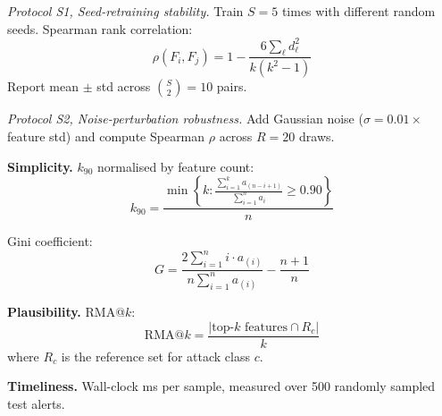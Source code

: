 \documentclass[12pt,a4paper]{report}
\begin{document}
\noindent\textit{Protocol S1, Seed-retraining stability.} Train $S = 5$ times with different random seeds. Spearman rank correlation:
\begin{equation}
\rho(F_i, F_j) = 1 - \frac{6 \sum_\ell d_\ell^2}{k(k^2 - 1)}
\end{equation}
Report mean $\pm$ std across $\binom{S}{2} = 10$ pairs.

\noindent\textit{Protocol S2, Noise-perturbation robustness.} Add Gaussian noise ($\sigma = 0.01 \times$ feature std) and compute Spearman $\rho$ across $R = 20$ draws.

\vspace{1em}
\noindent\textbf{Simplicity.} $k_{90}$ normalised by feature count:
\begin{equation}
k_{90} = \frac{\min \left\{ k : \frac{\sum_{i=1}^{k} a_{(n-i+1)}}{\sum_{i=1}^{n} a_i} \geq 0.90 \right\}}{n}
\end{equation}

Gini coefficient:
\begin{equation}
G = \frac{2 \sum_{i=1}^{n} i \cdot a_{(i)}}{n \sum_{i=1}^{n} a_{(i)}} - \frac{n + 1}{n}
\end{equation}

\vspace{1em}
\noindent\textbf{Plausibility.} RMA@$k$:
\begin{equation}
\text{RMA@}k = \frac{|\text{top-}k \text{ features} \cap R_c|}{k}
\end{equation}
where $R_c$ is the reference set for attack class $c$.

\vspace{1em}
\noindent\textbf{Timeliness.} Wall-clock ms per sample, measured over 500 randomly sampled test alerts.

\vspace{1em}
\end{document}
